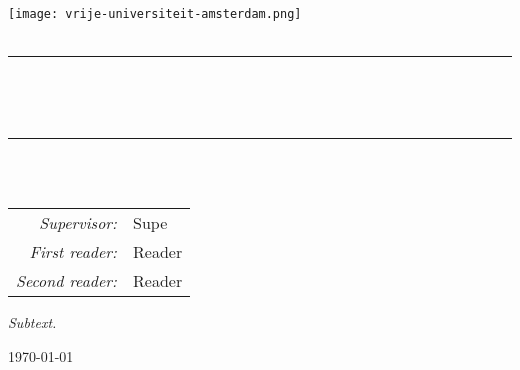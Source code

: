 \begin{titlepage}
    \newcommand{\HRule}{\rule{0.8\linewidth}{0.2mm}}

    \centering

    \vspace*{1em}
    \textsc{\large \theinstitution}\\[1em]

    \texttt{[image: vrije-universiteit-amsterdam.png]} \\[2em]

    \vspace{4em}
    \textsc{\Large \thesubject}\\
    \vspace{4em}

    \HRule\\[0.7cm]

    \begin{minipage}{0.75\textwidth}
      \centering
      \setlength{\baselineskip}{2em}
      {\LARGE\bfseries \thetitle}\\[1em]
      \vspace{1em}
    \end{minipage}

    \HRule\\[1.5cm]

    {\Large \theauthor}\\
    \vspace{2em}
    \begin{minipage}{0.72\textwidth}
      \large
      \centering
      \begin{tabular}{ r l }
        \textit{Supervisor:}     & Supe        \\
        \textit{First reader:}   & Reader \\
        \textit{Second reader:} & Reader
      \end{tabular}
    \end{minipage}

    \vfill
    \begin{minipage}{0.8\textwidth}
      \centering
      \textit{\large
        Subtext.
      }
    \end{minipage}

    \vspace{2em}
    {\large\today}

    \vspace{4em}
\end{titlepage}
